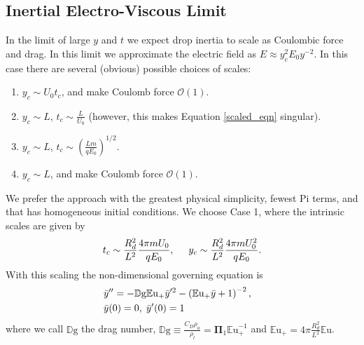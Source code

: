 \documentclass[12pt,a4paper,oneside]{book}
\begin{document}
\subsection{Inertial Electro-Viscous Limit}
In the limit of large $y$ and $t$ we expect drop inertia to scale as Coulombic force and drag. In this limit we approximate the electric field as $E \approx y_c^2 E_0 y^{-2}$. In this case there are several (obvious) possible choices of scales:
\begin{enumerate}
\item $y_c \sim U_0 t_c$, and make Coulomb force $\mathcal{O}(1)$.
\item $y_c \sim L$, $t_c \sim \frac{L}{U_0}$ (however, this makes Equation \ref{scaled_eqn} singular).
\item $y_c \sim L$, $t_c \sim \left( \frac{L m}{q E_0} \right)^{1/2}$.
\item $y_c \sim L$, and make Coulomb force $\mathcal{O}(1)$.
\end{enumerate}

We prefer the approach with the greatest physical simplicity, fewest Pi terms, and that has homogeneous initial conditions. We choose Case 1, where the intrinsic scales are given by
\[ t_c \sim \frac{R_d^2}{L^2} \frac{4 \pi m U_0}{q E_0}, \hspace{5mm} y_c \sim \frac{R_d^2}{L^2} \frac{4 \pi m U_0^2}{q E_0}.
\]
With this scaling the non-dimensional governing equation is 
\begin{eqnarray}
&\bar{y}'' = - \mathbb{D}\mbox{g} \mathbb{E}\mbox{u}_+ \bar{y}'^2 - \left( \mathbb{E}\mbox{u}_+ \bar{y} + 1 \right)^{-2}, & \nonumber \\
& \bar{y}(0) = 0, \hspace{1 mm} \bar{y}'(0) = 1 & \label{drag_limit}
\end{eqnarray}
where we call $\mathbb{D}\mbox{g}$ the drag number, $\mathbb{D}\mbox{g} \equiv \frac{C_D \rho_a}{\rho_l} = \mathbf{\Pi}_1 {\mathbb{E}\mbox{u}}_+^{-1}$ and $\mathbb{E}\mbox{u}_+ = 4 \pi \frac{R_d^2}{L^2} \mathbb{E}\mbox{u}$.
\end{document}
